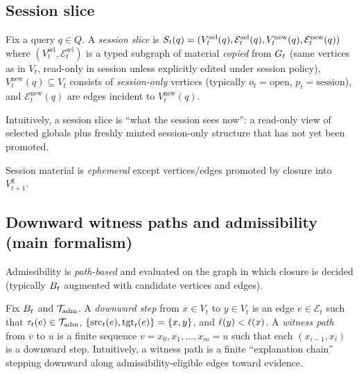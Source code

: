 \subsection{Session slice}
\label{sec:formal-session}

\begin{definition}
\label{def:session-slice}
Fix a query $q\in Q$.
A \emph{session slice} is $S_t(q) = (V^{\mathrm{sel}}_t(q),\mathcal{E}^{\mathrm{sel}}_t(q), V^{\mathrm{new}}_t(q),\mathcal{E}^{\mathrm{new}}_t(q))$ where $(V^{\mathrm{sel}}_t,\mathcal{E}^{\mathrm{sel}}_t)$ is a typed subgraph of material \emph{copied} from $G_t$ (same vertices as in $V_t$, read-only in session unless explicitly edited under session policy),
$V^{\mathrm{new}}_t(q)\subseteq V_t$ consists of \emph{session-only} vertices (typically $o_t=\text{open}$, $p_t=\text{session}$),
and $\mathcal{E}^{\mathrm{new}}_t(q)$ are edges incident to $V^{\mathrm{new}}_t(q)$.
\end{definition}

Intuitively, a session slice is ``what the session sees now'': a read-only view of selected globals plus freshly minted session-only structure that has not yet been promoted.

Session material is \emph{ephemeral} except vertices/edges promoted by closure into $V^{\mathrm{g}}_{t+1}$.

\subsection{Downward witness paths and admissibility (main formalism)}
\label{sec:formal-admissibility}

Admissibility is \emph{path-based} and evaluated on the graph in which closure is decided (typically $B_t$ augmented with candidate vertices and edges).

\begin{definition}
\label{def:witness-path}
Fix $B_t$ and $\mathcal{T}_{\mathrm{adm}}$.
A \emph{downward step} from $x\in V_t$ to $y\in V_t$ is an edge $e\in\mathcal{E}_t$ such that $\tau_t(e)\in\mathcal{T}_{\mathrm{adm}}$, $\{\mathrm{src}_t(e),\mathrm{tgt}_t(e)\}=\{x,y\}$, and $\ell(y)<\ell(x)$.
A \emph{witness path} from $v$ to $u$ is a finite sequence $v=x_0,x_1,\ldots,x_m=u$ such that each $(x_{i-1},x_i)$ is a downward step.
Intuitively, a witness path is a finite ``explanation chain'' stepping downward along admissibility-eligible edges toward evidence.
\end{definition}

